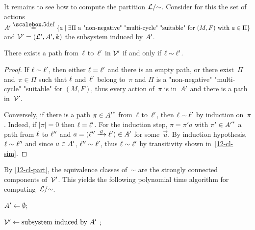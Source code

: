 \begin{scope}
\begin{algorithm}

\caption{$\text{cycle}(\?V,M,F)$}
\label{12-algo-zcycle}
\end{algorithm}

It remains to see how to compute the partition $\mathcal L/{\sim}$. Consider
for this the set of actions
$\Act'\eqdef\{a\mid\exists\Pi\text{ a "non-negative" "multi-cycle"
  "suitable" for $(M,F)$ with $a\in\Pi$}\}$ and
$\mathcal V'=(\mathcal L',A',k)$ the subsystem induced by $A'$.
\begin{claim}\label{12-cl-part}
  There exists a path from~$\ell$ to~$\ell'$ in $\mathcal V'$
  if and only if $\ell\sim\ell'$.
\end{claim}
\begin{proof}
  If $\ell\sim\ell'$, then either $\ell=\ell'$ and there is an empty
  path, or there exist~$\Pi$ and~$\pi\in\Pi$ such that $\ell$
  and~$\ell'$ belong to~$\pi$ and $\Pi$ is a "non-negative"
  "multi-cycle" "suitable" for $(M,F)$, thus every action of~$\pi$ is
  in~$A'$ and there is a path in~$\mathcal V'$.  

  Conversely, if there is a path $\pi\in{A'}^\ast$ from~$\ell$
  to~$\ell'$, then $\ell\sim\ell'$ by induction on~$\pi$.  Indeed, if
  $|\pi|=0$ then $\ell=\ell'$.  For the induction step, $\pi=\pi' a$
  with $\pi'\in{A'}^\ast$ a path from $\ell$ to $\ell''$ and
  $a=(\loc''\step{\vec u}\loc')\in\Act'$ for some~$\vec u$.  By
  induction hypothesis, $\ell\sim\ell''$ and since $a\in A'$,
  $\ell''\sim\ell'$, thus $\ell\sim\ell'$ by transitivity shown
  in~\cref{12-cl-sim}. 
\end{proof}

By \cref{12-cl-part}, the equivalence classes of~$\sim$ are the
strongly connected components of~$\mathcal V'$.  This yields the following
polynomial time algorithm for computing~$\mathcal L/{\sim}$.

\begin{algorithm}

$A'\leftarrow\emptyset$;


$\mathcal V'\leftarrow \text{subsystem induced by~$A'$}$ ;

\caption{$\text{partition}(\?V,M,F)$}
\label{12-algo-part}
\end{algorithm}


\end{scope}
